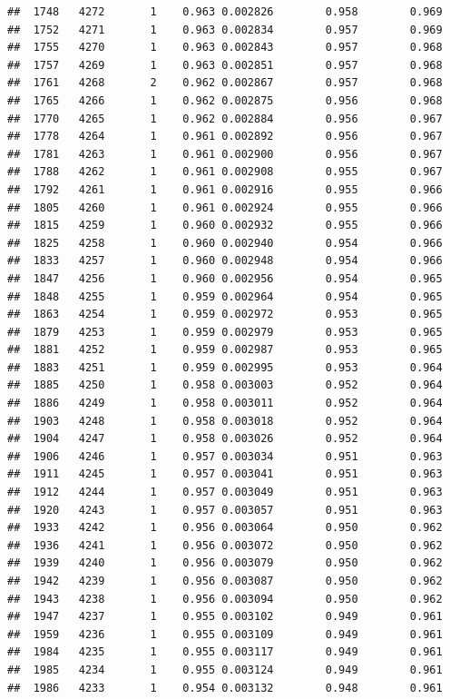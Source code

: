 \documentclass[
]{book}
\begin{document}
\begin{verbatim}
##  1748   4272       1    0.963 0.002826        0.958        0.969
##  1752   4271       1    0.963 0.002834        0.957        0.969
##  1755   4270       1    0.963 0.002843        0.957        0.968
##  1757   4269       1    0.963 0.002851        0.957        0.968
##  1761   4268       2    0.962 0.002867        0.957        0.968
##  1765   4266       1    0.962 0.002875        0.956        0.968
##  1770   4265       1    0.962 0.002884        0.956        0.967
##  1778   4264       1    0.961 0.002892        0.956        0.967
##  1781   4263       1    0.961 0.002900        0.956        0.967
##  1788   4262       1    0.961 0.002908        0.955        0.967
##  1792   4261       1    0.961 0.002916        0.955        0.966
##  1805   4260       1    0.961 0.002924        0.955        0.966
##  1815   4259       1    0.960 0.002932        0.955        0.966
##  1825   4258       1    0.960 0.002940        0.954        0.966
##  1833   4257       1    0.960 0.002948        0.954        0.966
##  1847   4256       1    0.960 0.002956        0.954        0.965
##  1848   4255       1    0.959 0.002964        0.954        0.965
##  1863   4254       1    0.959 0.002972        0.953        0.965
##  1879   4253       1    0.959 0.002979        0.953        0.965
##  1881   4252       1    0.959 0.002987        0.953        0.965
##  1883   4251       1    0.959 0.002995        0.953        0.964
##  1885   4250       1    0.958 0.003003        0.952        0.964
##  1886   4249       1    0.958 0.003011        0.952        0.964
##  1903   4248       1    0.958 0.003018        0.952        0.964
##  1904   4247       1    0.958 0.003026        0.952        0.964
##  1906   4246       1    0.957 0.003034        0.951        0.963
##  1911   4245       1    0.957 0.003041        0.951        0.963
##  1912   4244       1    0.957 0.003049        0.951        0.963
##  1920   4243       1    0.957 0.003057        0.951        0.963
##  1933   4242       1    0.956 0.003064        0.950        0.962
##  1936   4241       1    0.956 0.003072        0.950        0.962
##  1939   4240       1    0.956 0.003079        0.950        0.962
##  1942   4239       1    0.956 0.003087        0.950        0.962
##  1943   4238       1    0.956 0.003094        0.950        0.962
##  1947   4237       1    0.955 0.003102        0.949        0.961
##  1959   4236       1    0.955 0.003109        0.949        0.961
##  1984   4235       1    0.955 0.003117        0.949        0.961
##  1985   4234       1    0.955 0.003124        0.949        0.961
##  1986   4233       1    0.954 0.003132        0.948        0.961

\end{verbatim}
\end{document}

